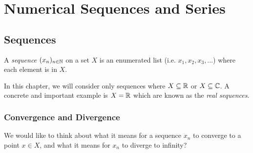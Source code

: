\documentclass[../main.tex]{subfiles}
\begin{document}
\chapter{Numerical Sequences and Series}
\section{Sequences}
\begin{definition}[Sequence]
  A \textit{sequence} $(x_n)_{n \in \mathbb{N}}$ on a set $X$ is an enumerated list (i.e. $x_1, x_2, x_3, \ldots$) where each element is in $X$.
\end{definition}
In this chapter, we will consider only sequences where $X \subseteq \mathbb{R}$ or $X \subseteq \mathbb{C}$.
A concrete and important example is $X = \mathbb{R}$ which are known as the \textit{real sequences}.

\subsection{Convergence and Divergence}
We would like to think about what it means for a sequence $x_n$ to converge to a point $x \in X$, and what it means for $x_n$ to diverge to infinity?
\end{document}
